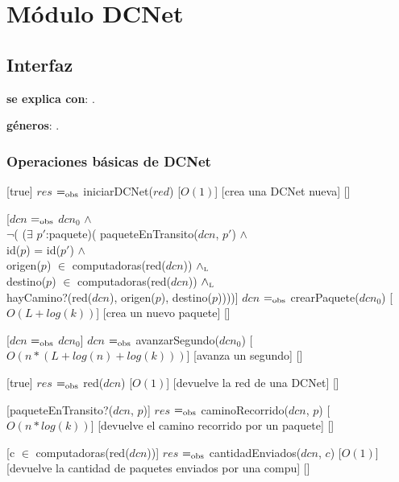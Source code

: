 \section{Módulo DCNet}

\subsection{Interfaz}

\textbf{se explica con}: .

\textbf{géneros}: .

\subsubsection{Operaciones básicas de DCNet}

[true]
{$res$ $=_{\mathrm{obs}}$ iniciarDCNet($red$)}
[$O(1)$]
[crea una DCNet nueva]
[]
~

[$dcn$ $=_{\mathrm{obs}}$ $dcn_0$ $\land$ \\
$\neg$( ($\exists$ $p'$:paquete)(	paqueteEnTransito($dcn$, $p'$) $\land$ \\
									id($p$) = id($p'$) $\land$ \\
									origen($p$) $\in$ computadoras(red($dcn$)) $\land_{\mathrm{\scriptscriptstyle{L}}}$ \\
									destino($p$) $\in$ computadoras(red($dcn$)) $\land_{\mathrm{\scriptscriptstyle{L}}}$ \\
									hayCamino?(red($dcn$), origen($p$), destino($p$))))]
{$dcn$ $=_{\mathrm{obs}}$ crearPaquete($dcn_0$)}
[$O(L + log(k))$]
[crea un nuevo paquete]
[]
~

[$dcn$ $=_{\mathrm{obs}}$ $dcn_0$]
{$dcn$ $=_{\mathrm{obs}}$ avanzarSegundo($dcn_0$)}
[$O(n * (L + log(n) + log(k)))$]
[avanza un segundo]
[]
~

[true]
{$res$ $=_{\mathrm{obs}}$ red($dcn$)}
[$O(1)$]
[devuelve la red de una DCNet]
[]
~

[paqueteEnTransito?($dcn$, $p$)]
{$res$ $=_{\mathrm{obs}}$ caminoRecorrido($dcn$, $p$)}
[$O(n * log(k))$]
[devuelve el camino recorrido por un paquete]
[]
~

[c $\in$ computadoras(red($dcn$))]
{$res$ $=_{\mathrm{obs}}$ cantidadEnviados($dcn$, $c$)}
[$O(1)$]
[devuelve la cantidad de paquetes enviados por una compu]
[]
~

